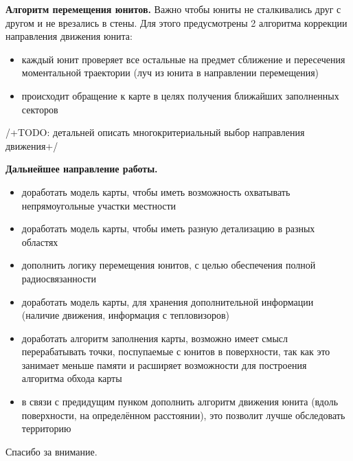 \begin{slide}

\makeatletter
\let\@topfil\relax
\makeatother

    \textbf{Алгоритм перемещения юнитов.} Важно чтобы юниты не сталкивались друг с другом и не врезались в стены.
    Для этого предусмотрены 2 алгоритма коррекции направления движения юнита: 
    \begin{itemize}
        \item каждый юнит проверяет все остальные на предмет сближение и пересечения моментальной траектории
              (луч из юнита в направлении перемещения)
        \item происходит обращение к карте в целях получения ближайших заполненных секторов
    \end{itemize}

    /+TODO: детальней описать многокритериальный выбор направления движения+/

\end{slide}

\begin{slide}

\makeatletter
\let\@topfil\relax
\makeatother

    \textbf{Дальнейшее направление работы.}
    \small
    \begin{itemize}
        \item доработать модель карты, чтобы иметь возможность охватывать непрямоугольные участки местности
        \item доработать модель карты, чтобы иметь разную детализацию в разных областях
        \item дополнить логику перемещения юнитов, с целью обеспечения полной радиосвязанности
        \item доработать модель карты, для хранения дополнительной информации (наличие движения, информация с тепловизоров)
        \item доработать алгоритм заполнения карты, возможно имеет смысл перерабатывать точки, поспупаемые с юнитов в 
                поверхности, так как это занимает меньше памяти и расширяет возможности для построения алгоритма обхода карты
        \item в связи с предидущим пунком дополнить алгоритм движения юнита (вдоль поверхности, на определённом расстоянии),
              это позволит лучше обследовать территорию
    \end{itemize}

\end{slide}

\begin{slide}
\begin{center}
    \LARGE Спасибо за внимание.
\end{center}
\end{slide}


